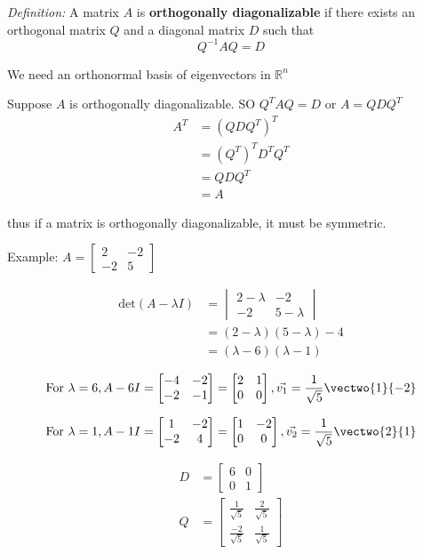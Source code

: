 \documentclass[12pt]{article}
\newcommand{\R}[1]{\mathbb{R}^{#1}}
\begin{document}
\textit{Definition:} A matrix $A$ is {\bf orthogonally diagonalizable} if there exists an orthogonal matrix $Q$ and a diagonal matrix $D$ such that \[ Q^{-1}AQ = D \]

We need an orthonormal basis of eigenvectors in $\R{n}$

Suppose $A$ is orthogonally diagonalizable. SO $Q^TAQ = D$ or $A = QDQ^T$
\begin{align*}
A^T &= (QDQ^T)^T\\
&= (Q^T)^TD^TQ^T\\
&= QDQ^T\\
&= A
\end{align*}

thus if a matrix is orthogonally diagonalizable, it must be symmetric.


Example: $A = \begin{bmatrix}2&-2\\-2&5\end{bmatrix}$

\begin{align*}
\text{det}(A-\lambda I) &= \begin{vmatrix}2-\lambda&-2\\-2&5-\lambda\end{vmatrix}\\
&= (2-\lambda)(5-\lambda) - 4\\
&= (\lambda - 6)(\lambda - 1)
\end{align*}

\[ \text{For } \lambda = 6, A-6I = \begin{bmatrix}-4&-2\\-2&-1\end{bmatrix} = \begin{bmatrix}2&1\\0&0\end{bmatrix}, \vec{v_1} = \frac{1}{\sqrt{5}}\vectwo{1}{-2} \]

\[ \text{For } \lambda = 1, A-1I = \begin{bmatrix}1&-2\\-2&4\end{bmatrix} = \begin{bmatrix}1&-2\\0&0\end{bmatrix}, \vec{v_2} = \frac{1}{\sqrt{5}}\vectwo{2}{1} \]

\begin{align*}
D &= \begin{bmatrix}6&0\\0&1\end{bmatrix}\\
Q &= \begin{bmatrix}\frac{1}{\sqrt{5}}&\frac{2}{\sqrt{5}}\\\frac{-2}{\sqrt{5}}&\frac{1}{\sqrt{5}}\end{bmatrix}
\end{align*}
\end{document}
